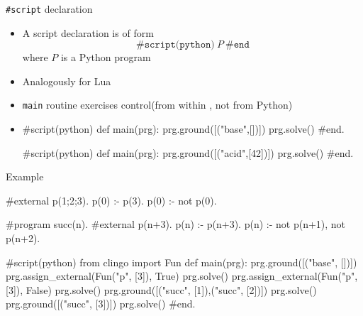 \begin{frame}[fragile]{\texttt{\#script} declaration}
  \begin{itemize}
  \item A \alert{script declaration} is of form
    \[
    \texttt{\#script(python)} \ P \ \texttt{\#end}
    \]
    where $P$ is a Python program
  \item<2> Analogously for Lua
  \item<4-> \alert{\texttt{main}} routine exercises control\pause[5] \alert<5>{(from within \clingo, not from Python)}
  \item<6-> 
    \par\medskip\footnotesize
    \begin{minipage}{0.4\linewidth}
\begin{semiverbatim}
#script(python)
def main(prg):
    prg.ground([("base",[])])
    prg.solve()
#end.
\end{semiverbatim}
    \end{minipage}
    \qquad\pause[7]
    \begin{minipage}{0.4\linewidth}
\begin{semiverbatim}
#script(python)
def main(prg):
    prg.ground([("acid",[42])])
    prg.solve()
#end.
\end{semiverbatim}
    \end{minipage}
  \end{itemize}
\end{frame}
\begin{frame}[fragile]{Example}
\scriptsize\vspace{-10pt}%
\begin{semiverbatim}
   \alert<3>{#external p(1;2;3).}
   \alert<3>{p(0) :- p(3).}
   \alert<3>{p(0) :- not p(0).}

   \alert<3>{#program succ(n).}
   \alert<3>{#external p(n+3).}
   \alert<3>{p(n) :- p(n+3).}
   \alert<3>{p(n) :- not p(n+1), not p(n+2).}

   \alert<2>{#script(python)}
   from clingo import Fun
   \alert<2>{def main(\alert<3>{prg})}:
       prg.ground([("base", [])])
       prg.assign_external(Fun("p", [3]), True)
       prg.solve()
       prg.assign_external(Fun("p", [3]), False)
       prg.solve()
       prg.ground([("succ", [1]),("succ", [2])])
       prg.solve()
       prg.ground([("succ", [3])])
       prg.solve()
   \alert<2>{#end}.
\end{semiverbatim}
\end{frame}
